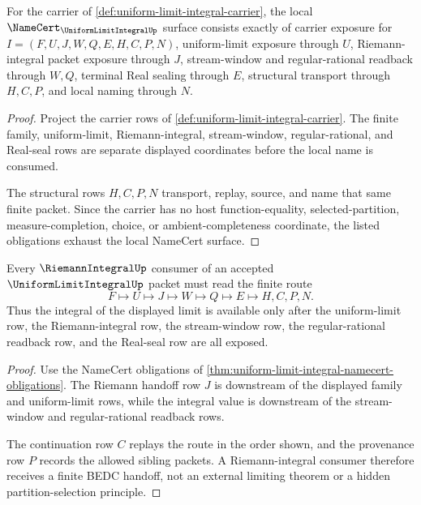 \begin{theorem}
\label{thm:uniform-limit-integral-namecert-obligations}
For the carrier of \autoref{def:uniform-limit-integral-carrier}, the local $\NameCert_{\UniformLimitIntegralUp}$ surface consists exactly of carrier exposure for $I=(F,U,J,W,Q,E,H,C,P,N)$, uniform-limit exposure through $U$, Riemann-integral packet exposure through $J$, stream-window and regular-rational readback through $W,Q$, terminal Real sealing through $E$, structural transport through $H,C,P$, and local naming through $N$.
\end{theorem}
\begin{proof}
Project the carrier rows of \autoref{def:uniform-limit-integral-carrier}. The finite family, uniform-limit, Riemann-integral, stream-window, regular-rational, and Real-seal rows are separate displayed coordinates before the local name is consumed.

The structural rows $H,C,P,N$ transport, replay, source, and name that same finite packet. Since the carrier has no host function-equality, selected-partition, measure-completion, choice, or ambient-completeness coordinate, the listed obligations exhaust the local NameCert surface.
\end{proof}

\begin{theorem}
\label{thm:uniform-limit-integral-riemann-handoff}
Every $\RiemannIntegralUp$ consumer of an accepted $\UniformLimitIntegralUp$ packet must read the finite route
$$
F \longmapsto U \longmapsto J \longmapsto W \longmapsto Q \longmapsto E \longmapsto H,C,P,N .
$$
Thus the integral of the displayed limit is available only after the uniform-limit row, the Riemann-integral row, the stream-window row, the regular-rational readback row, and the Real-seal row are all exposed.
\end{theorem}
\begin{proof}
Use the NameCert obligations of \autoref{thm:uniform-limit-integral-namecert-obligations}. The Riemann handoff row $J$ is downstream of the displayed family and uniform-limit rows, while the integral value is downstream of the stream-window and regular-rational readback rows.

The continuation row $C$ replays the route in the order shown, and the provenance row $P$ records the allowed sibling packets. A Riemann-integral consumer therefore receives a finite BEDC handoff, not an external limiting theorem or a hidden partition-selection principle.
\end{proof}

